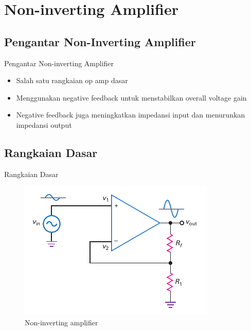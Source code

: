 \section{Non-inverting Amplifier}

\subsection{Pengantar Non-Inverting Amplifier}
\begin{frame}{Pengantar Non-inverting Amplifier}
	\begin{itemize}
		\item Salah satu rangkaian op amp dasar
		\item Menggunakan negative feedback untuk menstabilkan overall voltage gain
		\item Negative feedback juga meningkatkan impedansi input dan menurunkan impedansi output
	\end{itemize}
\end{frame}

\subsection{Rangkaian Dasar}
\begin{frame}{Rangkaian Dasar}
	\begin{figure}
		\centering
		\includegraphics[width=0.5\linewidth]{gambar/fig-16.18}
		\caption{Non-inverting amplifier}
		\label{fig-16.18}
	\end{figure}
\end{frame}

